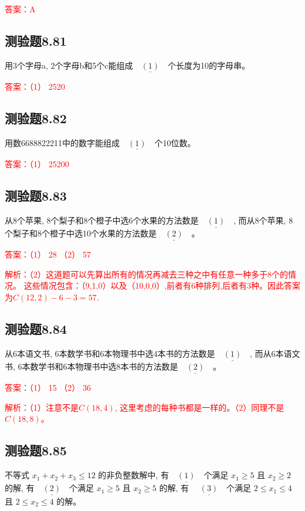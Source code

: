 \documentclass[UTF8, heading=true]{ctexart}
\begin{document}
\textcolor{red}{答案：A}

\subsection{测验题8.81}

用3个字母a, 2个字母b和5个c能组成$\underline{\quad(1)\quad}$个长度为10的字母串。

\textcolor{red}{答案：（1） 2520}

\subsection{测验题8.82}
用数6688822211中的数字能组成$\underline{\quad(1)\quad}$个10位数。

\textcolor{red}{答案：（1） 25200}

\subsection{测验题8.83}

从8个苹果, 8个梨子和8个橙子中选6个水果的方法数是$\underline{\quad(1)\quad}$, 而从8个苹果, 8个梨子和8个橙子中选10个水果的方法数是$\underline{\quad(2)\quad}$。

\textcolor{red}{答案：（1） 28 （2） 57}

\textcolor{red}{解析：（2）这道题可以先算出所有的情况再减去三种之中有任意一种多于8个的情况。
这些情况包含：（9,1,0）以及（10,0,0）,前者有6种排列,后者有3种。因此答案为$C(12,2)-6-3=57$.}
\subsection{测验题8.84}

从6本语文书, 6本数学书和6本物理书中选4本书的方法数是$\underline{\quad(1)\quad}$, 而从6本语文书, 6本数学书和6本物理书中选8本书的方法数是$\underline{\quad(2)\quad}$。

\textcolor{red}{答案：（1） 15 （2） 36}

\textcolor{red}{解析：（1）注意不是$C(18,4)$, 这里考虑的每种书都是一样的。（2）同理不是$C(18,8)$。}


\subsection{测验题8.85}

不等式 $x_1+x_2+x_3 \leq 12$ 的非负整数解中, 有$\underline{\quad(1)\quad}$个满足 $x_1 \geq 5$ 且 $x_2 \geq 2$ 的解, 有$\underline{\quad(2)\quad}$个满足 $x_1 \geq 5$ 且 $x_2 \geq 5$ 的解, 有 $\underline{\quad(3)\quad}$个满足 $2 \leq x_1 \leq 4$ 且 $2 \leq x_2 \leq 4$ 的解。
\end{document}
